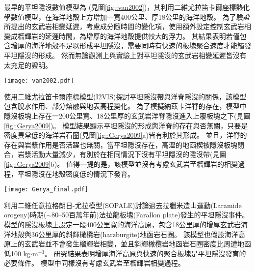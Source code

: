 最早的平坦隱沒數值模型為\citet{van2002role} (見圖\ref{fig::van2002})，其利用二維尤拉笛卡爾座標熱化學數值模型，在海洋地殼上方增加一寬400公里、厚18公里的海洋地殼。
為了驗證\citet{Gutscher2000A}所提出的玄武岩相變延遲，\citet{van2002role}考慮成分隨時間的變化項，使用額外設定控制玄武岩相變成榴輝岩的延遲時間，為增厚的海洋地殼提供較大的浮力。
其結果表明若僅包含增厚的海洋地殼不足以形成平坦隱沒，需要同時有快速的板塊聚合速度才能觸發平坦隱沒的形成。
然而無論觀測上與實驗上對平坦隱沒的玄武岩相變延遲皆沒有太充足的證明。

\begin{figure*}[hb!]
    \centering
    \texttt{[image: van2002.pdf]}
    \caption[正常的隱沒帶與包含海洋高原的隱沒帶隨模型時間變化，摘自\citet{van2002role}]{正常的隱沒帶(左)與包含海洋高原的隱沒帶(右)隨模型時間變化，摘自\citet{van2002role}。黑白區域繪出海洋地殼的化學成分從玄武岩(黑)到榴輝岩(白)的變化。水平軸為與海溝的距離，背景顏色為溫度。
    }
    \label{fig::van2002}
\end{figure*}

\citet{Gerya2009}使用二維尤拉笛卡爾座標模型(I2VIS)探討平坦隱沒帶與洋脊隱沒的關係，該模型包含脫水作用、部分熔融與地表高程變化。
為了模擬納茲卡洋脊的存在，模型中隱沒板塊上存在一200公里寬、18公里厚的玄武岩洋脊隱沒進入上覆板塊之下(見圖\ref{fig::Gerya2009})。
模型結果顯示平坦隱沒的形成與洋脊的存在與否無關，只要是密度異常低的海洋岩石圈(見圖\ref{fig::Gerya2009}a)皆有利於其形成。
並且，洋脊的存在與岩漿作用是否活躍也無關，當平坦隱沒存在，高溫的地函楔被隱沒板塊閉合，岩漿活動大量減少，有別於在相同情況下沒有平坦隱沒的隱沒帶(見圖\ref{fig::Gerya2009}b)。
值得一提的是，該模型並沒有考慮玄武岩至榴輝岩的相變過程，平坦隱沒在地殼密度低的情況下發育。

\begin{figure*}[ht!]
    \centering
    \texttt{[image: Gerya\_final.pdf]}
    \caption[\citet{Gerya2009}平坦隱沒模型結果]{\citet{Gerya2009}中平坦隱沒模型於第12個百萬年的結果。圖組(a)與圖組(b)分別為隱沒海洋地函岩石圈密度為3100 kgm$^{-3}$與3300 kgm$^{-3}$的結果。(a)上圖與(b)上圖為包含洋脊隱沒的模型，(a)(b)下圖為不包含洋脊的模型，圖中白線為等溫線。其中，顏色代表不同岩相: 1、2 = 大陸地殼、3、4 = 沉積物、5、6 = 玄武岩、7、8 = 輝長岩、9、10 = 無水地函、11 = 蛇紋岩、12、13、14 = 含水地函。
    }
    \label{fig::Gerya2009}
\end{figure*}

\citet{Liu2016}利用二維任意拉格朗日-尤拉模型(SOPALE)討論過去拉臘米造山運動(Laramide orogeny)時期($\sim$80–50百萬年前)法拉龍板塊(Farallon plate)發生的平坦隱沒事件。
模型的隱沒板塊上設定一段400公里寬的海洋高原，包含18公里厚的增厚玄武岩海洋地殼與36公里厚的斜輝橄欖岩(harzburgite)地函岩石圈。
該模型也假設海洋高原上的玄武岩並不會發生榴輝岩相變，並且斜輝橄欖岩地函岩石圈密度比周遭地函低100 kg$\cdot$m$^{-3}$。
研究結果表明增厚海洋高原與快速的聚合板塊是平坦隱沒發育的必要條件。
模型中同樣沒有考慮玄武岩至榴輝岩相變過程。

